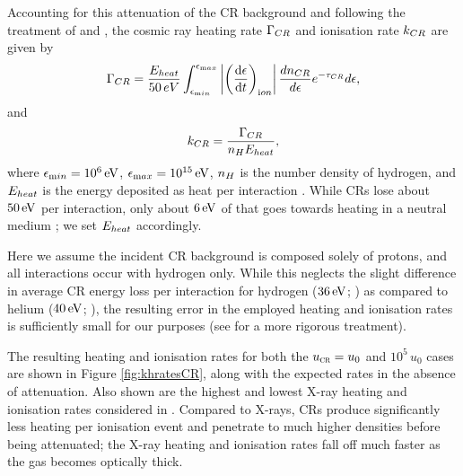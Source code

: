\documentclass[../thesis.tex]{subfiles}
\begin{document}
Accounting for this attenuation of the CR background and following the treatment of \citet{StacyBromm2007} and \citet{InayoshiOmukai2011}, the cosmic ray heating rate $\Gamma_{\mathrm \small CR}$ and ionisation rate $k_{\mathrm \small CR}$ are given by
\begin{equation}
\Gamma_{\mathrm \small CR} = 
    \frac{ E_{\mathrm \small heat}}{50\,{\mathrm \small eV}} 
    \int_{\epsilon_{\mathrm min}}^{\epsilon_{\mathrm max}} 
    \left| \left( \frac{{\mathrm d}\epsilon} {{\mathrm d}t} \right)_{\mathrm ion} \right|
    \frac{dn_{\mathrm \tiny CR}}{d\epsilon} e^{-\tau_{\mathrm \small CR}} d\epsilon,
\end{equation}
and 
\begin{equation}
k_{\mathrm \small CR} = \frac{\Gamma_{\mathrm \small CR}}{ n_{\mathrm \small H} E_{\mathrm \small heat}},
\end{equation}
where $\epsilon_{\mathrm min} = 10^6\,\mathrm{eV}$, $\epsilon_{\mathrm max}= 10^{15}\,\mathrm{eV}$, $n_{\mathrm \small H}$ is the number density of hydrogen, and $E_{\mathrm \small heat}$ is the energy deposited as heat per interaction \citep{Schlickeiser2002}.
While CRs lose about $50\,\mathrm{eV}$ per interaction, only about $6\,\mathrm{eV}$ of that goes towards heating in a neutral medium \citep{SpitzerScott1969,ShullvanSteenberg1985}; we set $E_{\mathrm \small heat}$ accordingly.

Here we assume the incident CR background is composed solely of protons, and all interactions occur with hydrogen only.  
While this neglects the slight difference in average CR energy loss per interaction for hydrogen ($36\,\mathrm{eV}$; \citealt{BakkerSegre1951}) as compared to helium ($40\,\mathrm{eV}$; \citealt{WeissBernstein1956}), the resulting error in the employed heating and ionisation rates is sufficiently small for our purposes (see \citealt{JascheCiardiEnsslin2007} for a more rigorous treatment). 

The resulting heating and ionisation rates for both the ${u}_{\textsc{cr}}=u_0$ and $10^5\,u_0$ cases are shown in Figure \ref{fig:khratesCR}, along with the expected rates in the absence of attenuation.
Also shown are the highest and lowest X-ray heating and ionisation rates considered in \citet{Hummeletal2015}. 
Compared to X-rays, CRs produce significantly less heating per ionisation event and penetrate to much higher densities before being attenuated; the X-ray heating and ionisation rates fall off much faster as the gas becomes optically thick.
\end{document}
